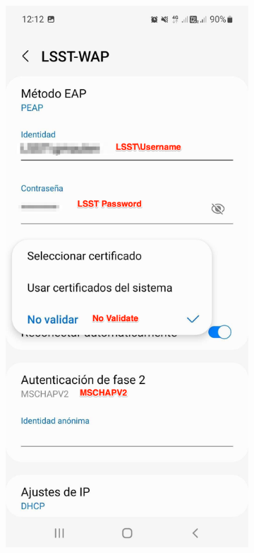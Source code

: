   \begin{figure}
    \centering
    \begin{subfigure}{0.40\textwidth}
      \includegraphics[width=\textwidth]{Images/Android3.png}

\end{subfigure}
\end{figure}
